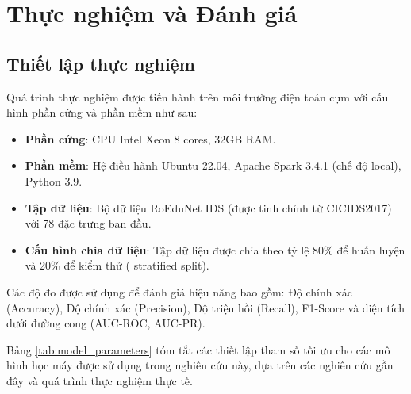 \chapter{Thực nghiệm và Đánh giá}

\section{Thiết lập thực nghiệm}
Quá trình thực nghiệm được tiến hành trên môi trường điện toán cụm với cấu hình phần cứng và phần mềm như sau:
\begin{itemize}
    \item \textbf{Phần cứng}: CPU Intel Xeon 8 cores, 32GB RAM.
    \item \textbf{Phần mềm}: Hệ điều hành Ubuntu 22.04, Apache Spark 3.4.1 (chế độ local), Python 3.9.
    \item \textbf{Tập dữ liệu}: Bộ dữ liệu RoEduNet IDS (được tinh chỉnh từ CICIDS2017) với 78 đặc trưng ban đầu.
    \item \textbf{Cấu hình chia dữ liệu}: Tập dữ liệu được chia theo tỷ lệ 80\% để huấn luyện và 20\% để kiểm thử ( stratified split).
\end{itemize}

Các độ đo được sử dụng để đánh giá hiệu năng bao gồm: Độ chính xác (Accuracy), Độ chính xác (Precision), Độ triệu hồi (Recall), F1-Score và diện tích dưới đường cong (AUC-ROC, AUC-PR).

Bảng \ref{tab:model_parameters} tóm tắt các thiết lập tham số tối ưu cho các mô hình học máy được sử dụng trong nghiên cứu này, dựa trên các nghiên cứu gần đây và quá trình thực nghiệm thực tế.

